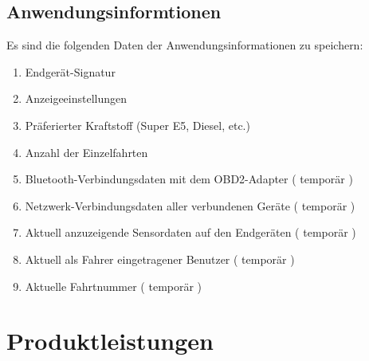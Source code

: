 \documentclass[pflichtenheft.tex]{subfiles}
\begin{document}
\section{Anwendungsinformtionen}
Es sind die folgenden Daten der Anwendungsinformationen zu speichern:

\begin{enumerate}
\setcounter{enumi}{\value{enumTemp}}
\item Endgerät-Signatur
\item Anzeigeeinstellungen
\item Präferierter Kraftstoff (Super E5, Diesel, etc.)
\item Anzahl der Einzelfahrten
\item Bluetooth-Verbindungsdaten mit dem OBD2-Adapter ( temporär )
\item Netzwerk-Verbindungsdaten aller verbundenen Geräte ( temporär ) 
\item Aktuell anzuzeigende Sensordaten auf den Endgeräten ( temporär )
\item Aktuell als Fahrer eingetragener Benutzer ( temporär )
\item Aktuelle Fahrtnummer ( temporär )
\setcounter{enumTemp}{\value{enumi}}
\end{enumerate}


\setcounter{enumTemp}{\value{enumi}}

\chapter{Produktleistungen}

\renewcommand{\theenumi}{/PL\ifnum \value{enumi}<10 0\fi\arabic{enumi}0/}
\renewcommand{\labelenumi}{\theenumi}
\renewcommand{\theenumii}{\arabic{enumii}}
\renewcommand{\labelenumii}{PL\ifnum \value{enumi}<10 0\fi\arabic{enumi}\arabic{enumii}/}
\end{document}

